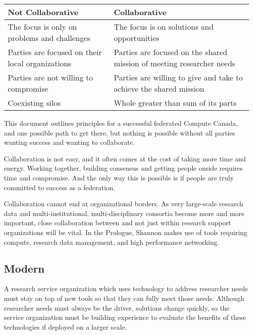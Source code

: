 \documentclass[11pt, letterpaper, twoside]{article}
\begin{document}
\begin{table}[ht] \centering \small {\sffamily
{}
\begin{tabular}{P{2.5in}|P{2.5in}}
\textcolor{cdaRed}{\textbf{Not Collaborative}} & \textcolor{cdaRed}{\textbf{Collaborative}} \\
\hline
\hline 
The focus is only on problems and challenges & The focus is on solutions and opportunities \\
Parties are focused on their local organizations & Parties are focused on the shared mission of meeting researcher needs \\
Parties are not willing to compromise & Parties are willing to give and take to achieve the shared mission \\
Coexisting silos & Whole greater than sum of its parts \\
\hline
\end{tabular}
}
\end{table}


This document outlines principles for a successful federated Compute
Canada, and one possible path to get there, but nothing is possible
without all parties wanting success and wanting to collaborate.


Collaboration is not easy, and it often comes at the cost of taking more
time and energy. Working together, building consensus and getting people
onside requires time and compromise. And the only way this is possible
is if people are truly committed to success as a federation.

Collaboration cannot end at organizational borders. As very large-scale
research data and multi-institutional, multi-disciplinary consortia
become more and more important, close collaboration between and not just
within research support organizations will be vital. In the Prologue,
Shannon makes use of tools requiring compute, research data management,
and high performance networking.

\subsection*{Modern}
%

A research service organization which uses technology to address
researcher needs must stay on top of new tools so that they can fully
meet those needs. Although researcher needs must always be the driver,
solutions change quickly, so the service organization must be building
experience to evaluate the benefits of these technologies if deployed on
a larger scale.
\end{document}
